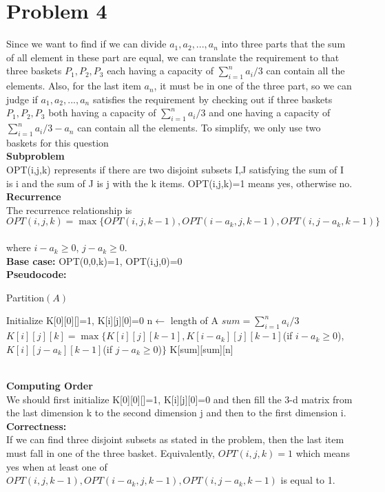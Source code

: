 \documentclass[twoside]{homework}
\begin{document}
\section*{Problem 4}
Since we want to find if we can divide ${a_1,a_2,...,a_n}$ into three parts that the sum of all element in these part are equal, we can translate the requirement to that three baskets $P_1,P_2,P_3$ each having a capacity of $\sum_{i=1}^{n}a_i/3$ can contain all the elements. Also, for the last item $a_n$, it must be in one of the three part, so we can judge if ${a_1,a_2,...,a_n}$ satisfies the requirement by checking out if three baskets $P_1,P_2,P_3$ both having a capacity of $\sum_{i=1}^{n}a_i/3$ and one having a capacity of $\sum_{i=1}^{n}a_i/3-a_n$ can contain all the elements. To simplify, we only use two baskets for this question\\
\textbf{Subproblem} 
\\OPT(i,j,k) represents if there are two disjoint subsets I,J satisfying the sum of I is i and the sum of J is j with the k items. OPT(i,j,k)=1 means yes, otherwise no.\\
\textbf{Recurrence}\\ 
The recurrence relationship is $$OPT(i,j,k) = \max\{OPT(i,j,k-1),OPT(i-a_k,j,k-1), OPT(i,j-a_k,k-1)\}$$\\
where $i-a_k\ge 0$, $j-a_k\ge 0$.
\\\textbf{Base case:} OPT(0,0,k)=1, OPT(i,j,0)=0
\\\textbf{Pseudocode:}
\begin{algorithm}
	\caption*{Partition$(A)$}
	\begin{algorithmic}
		\STATE Initialize K[0][0][]=1, K[i][j][0]=0
        \STATE n$\leftarrow$ length of A
		\STATE $sum=\sum_{i=1}^{n}a_i/3$
	    \STATE$K[i][j][k]=\max\{K[i][j][k-1],K[i-a_k][j][k-1]$(if $i-a_k\ge 0$), $K[i][j-a_k][k-1]$(if $j-a_k\ge 0$)$\}$
		\ENDFOR
		\ENDFOR
		\ENDFOR
		\RETURN K[sum][sum][n]
	\end{algorithmic}
\end{algorithm}
\\\textbf{Computing Order}\\ 
We should first initialize K[0][0][]=1, K[i][j][0]=0 and then fill the 3-d matrix from the last dimension k to the second dimension j and then to the first dimension i.
\\\textbf{Correctness:\\}
If we can find three disjoint subsets as stated in the problem, then the last item must fall in one of the three basket. Equivalently, $OPT(i,j,k)=1$ which means yes when at least one of $OPT(i,j,k-1),OPT(i-a_k,j,k-1), OPT(i,j-a_k,k-1)$ is equal to 1.
\end{document}
